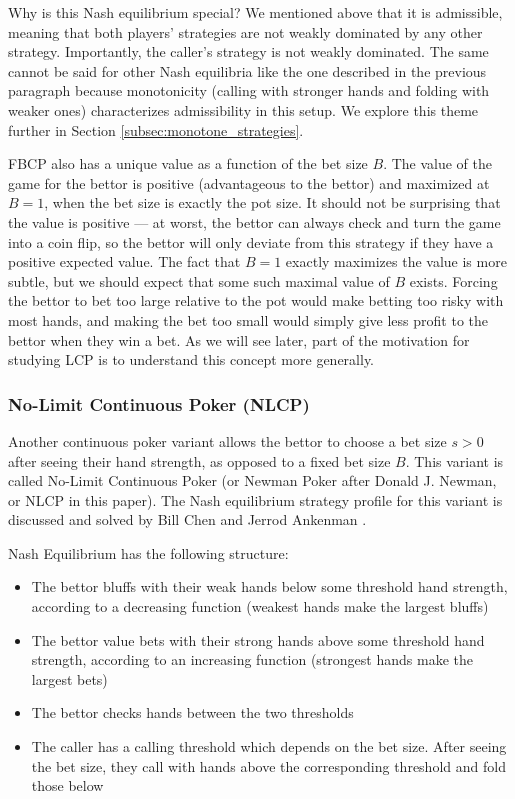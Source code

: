 \documentclass[../../main/main.tex]{subfiles}
\begin{document}
Why is this Nash equilibrium special? We mentioned above that it is admissible, meaning that both players' strategies are not weakly dominated by any other strategy. Importantly, the caller's strategy is not weakly dominated. The same cannot be said for other Nash equilibria like the one described in the previous paragraph because monotonicity (calling with stronger hands and folding with weaker ones) characterizes admissibility in this setup. We explore this theme further in Section \ref{subsec:monotone_strategies}.

FBCP also has a unique value as a function of the bet size $B$. The value of the game for the bettor is positive (advantageous to the bettor) and maximized at $B = 1$, when the bet size is exactly the pot size. It should not be surprising that the value is positive --- at worst, the bettor can always check and turn the game into a coin flip, so the bettor will only deviate from this strategy if they have a positive expected value. The fact that $B=1$ exactly maximizes the value is more subtle, but we should expect that some such maximal value of $B$ exists. Forcing the bettor to bet too large relative to the pot would make betting too risky with most hands, and making the bet too small would simply give less profit to the bettor when they win a bet. As we will see later, part of the motivation for studying LCP is to understand this concept more generally.

\subsubsection{No-Limit Continuous Poker (NLCP)}
Another continuous poker variant allows the bettor to choose a bet size $s > 0$ after seeing their hand strength, as opposed to a fixed bet size $B$. This variant is called No-Limit Continuous Poker (or Newman Poker after Donald J. Newman, or NLCP in this paper). The Nash equilibrium strategy profile for this variant is discussed and solved by Bill Chen and Jerrod Ankenman \cite[p. 154]{chen2006mathematics}.

Nash Equilibrium has the following structure:

\begin{itemize}
    \item The bettor bluffs with their weak hands below some threshold hand strength, according to a decreasing function (weakest hands make the largest bluffs)
    \item The bettor value bets with their strong hands above some threshold hand strength, according to an increasing function (strongest hands make the largest bets)
    \item The bettor checks hands between the two thresholds
    \item The caller has a calling threshold which depends on the bet size. After seeing the bet size, they call with hands above the corresponding threshold and fold those below
\end{itemize}
\end{document}
